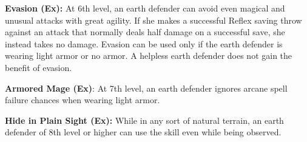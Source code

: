 {\textbf{Evasion (Ex):} At 6th level, an earth defender can avoid even magical and unusual attacks with great agility. If she makes a successful Reflex saving throw against an attack that normally deals half damage on a successful save, she instead takes no damage. Evasion can be used only if the earth defender is wearing light armor or no armor. A helpless earth defender does not gain the benefit of evasion.

\textbf{Armored Mage (Ex)}: At 7th level, an earth defender ignores arcane spell failure chances when wearing light armor.

\textbf{Hide in Plain Sight (Ex):} While in any sort of natural terrain, an earth defender of 8th level or higher can use the  skill even while being observed.

}